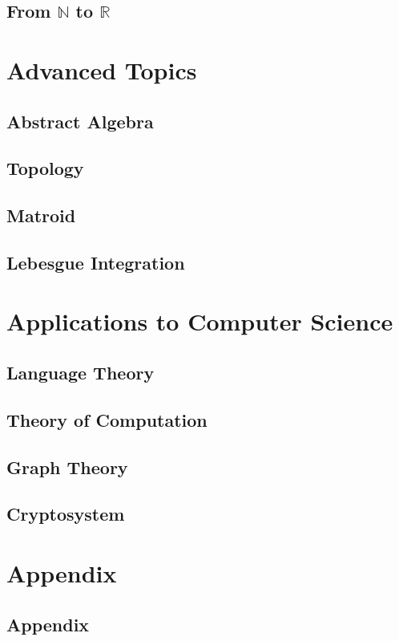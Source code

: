 \documentclass{report}
\theoremstyle{break}
\begin{document}
		\chapter{From $\mathbb{N}$ to $\mathbb{R}$}
		    
	
	\part{Advanced Topics}
	    
	    \chapter{Abstract Algebra}
	        
	    
	    \chapter{Topology}
	        
	        
	    \chapter{Matroid}
	        
	   
	    \chapter{Lebesgue Integration}
	        

	\part{Applications to Computer Science}
	
		\chapter{Language Theory}
		    
		
		\chapter{Theory of Computation}
		    
		
		\chapter{Graph Theory}
		    
		
		\chapter{Cryptosystem}
		    
	
	\part{Appendix}
		\chapter{Appendix}
		    
\end{document}
